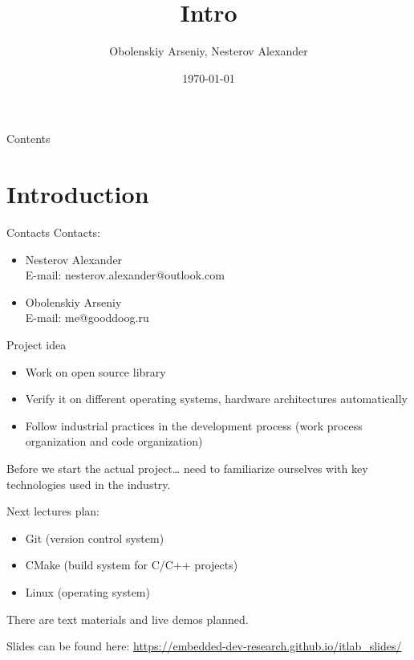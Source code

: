 \documentclass{beamer}
\title[Introduction]{Intro}
\author{Obolenskiy Arseniy, Nesterov Alexander}
\institute{ITLab}
\date{\today}
\begin{document}
\begin{frame}
    \titlepage%
\end{frame}

\begin{frame}{Contents}
    \tableofcontents
\end{frame}

\section{Introduction}

\begin{frame}{Contacts}
  Contacts:
  \begin{itemize}
    \item Nesterov Alexander \\
      E-mail: nesterov.alexander@outlook.com
    \item Obolenskiy Arseniy \\
      E-mail: me@gooddoog.ru
  \end{itemize}
\end{frame}


\begin{frame}{Project idea}
  \begin{itemize}
    \item Work on open source library
    \item Verify it on different operating systems, hardware architectures automatically
    \item Follow industrial practices in the development process (work process organization and code organization)
  \end{itemize}
\end{frame}

\begin{frame}{Before we start the actual project\ldots}
  need to familiarize ourselves with key technologies used in the industry.

  Next lectures plan:
  \begin{itemize}
    \item Git (version control system)
    \item CMake (build system for C/C++ projects)
    \item Linux (operating system)
  \end{itemize}

  There are text materials and live demos planned.

  Slides can be found here: \href{https://embedded-dev-research.github.io/itlab_slides/}{https://embedded-dev-research.github.io/itlab\_slides/}
\end{frame}
\end{document}
